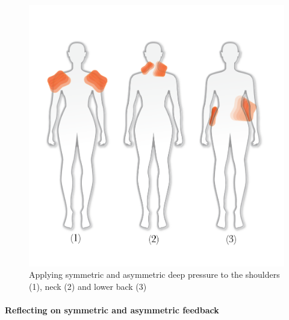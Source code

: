  \begin{figure}[t]
  \centering
  \includegraphics[width=0.9\linewidth]{Chapters/Figures/soma_chi/fig6_positions_numbers.png}
  \caption[Applying symmetric and asymmetric deep pressure]{Applying symmetric and asymmetric deep pressure to the shoulders (1), neck (2) and lower back (3)}
    \label{fig:neck}
\end{figure}

\paragraph{Reflecting on symmetric and asymmetric feedback}

